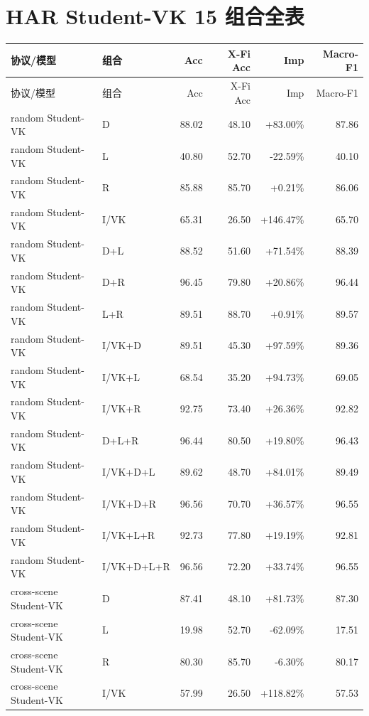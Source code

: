 \documentclass[UTF8,10pt]{ctexart}
\newcommand{\better}[1]{\textcolor{goodblue}{#1}}
\newcommand{\worse}[1]{\textcolor{badred}{#1}}
\begin{document}
\section{HAR Student-VK 15 组合全表}
{\tiny
\begin{longtable}{llrrrr}
\toprule
协议/模型 & 组合 & Acc & X-Fi Acc & Imp & Macro-F1\\
\midrule
\endfirsthead
\toprule
协议/模型 & 组合 & Acc & X-Fi Acc & Imp & Macro-F1\\
\midrule
\endhead
random Student-VK & D & 88.02 & 48.10 & \better{+83.00\%} & 87.86\\
random Student-VK & L & 40.80 & 52.70 & \worse{-22.59\%} & 40.10\\
random Student-VK & R & 85.88 & 85.70 & \better{+0.21\%} & 86.06\\
random Student-VK & I/VK & 65.31 & 26.50 & \better{+146.47\%} & 65.70\\
random Student-VK & D+L & 88.52 & 51.60 & \better{+71.54\%} & 88.39\\
random Student-VK & D+R & 96.45 & 79.80 & \better{+20.86\%} & 96.44\\
random Student-VK & L+R & 89.51 & 88.70 & \better{+0.91\%} & 89.57\\
random Student-VK & I/VK+D & 89.51 & 45.30 & \better{+97.59\%} & 89.36\\
random Student-VK & I/VK+L & 68.54 & 35.20 & \better{+94.73\%} & 69.05\\
random Student-VK & I/VK+R & 92.75 & 73.40 & \better{+26.36\%} & 92.82\\
random Student-VK & D+L+R & 96.44 & 80.50 & \better{+19.80\%} & 96.43\\
random Student-VK & I/VK+D+L & 89.62 & 48.70 & \better{+84.01\%} & 89.49\\
random Student-VK & I/VK+D+R & 96.56 & 70.70 & \better{+36.57\%} & 96.55\\
random Student-VK & I/VK+L+R & 92.73 & 77.80 & \better{+19.19\%} & 92.81\\
random Student-VK & I/VK+D+L+R & 96.56 & 72.20 & \better{+33.74\%} & 96.55\\
cross-scene Student-VK & D & 87.41 & 48.10 & \better{+81.73\%} & 87.30\\
cross-scene Student-VK & L & 19.98 & 52.70 & \worse{-62.09\%} & 17.51\\
cross-scene Student-VK & R & 80.30 & 85.70 & \worse{-6.30\%} & 80.17\\
cross-scene Student-VK & I/VK & 57.99 & 26.50 & \better{+118.82\%} & 57.53\\

\end{longtable}}
\end{document}
